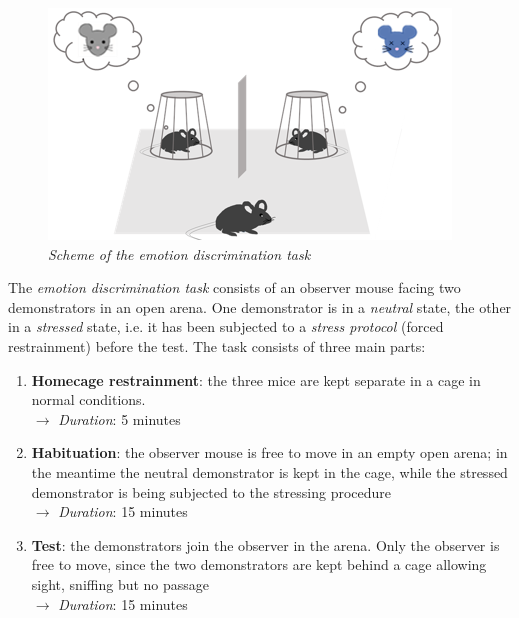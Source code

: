 \documentclass[a4paper]{article}
\begin{document}
\begin{figure}[H]
	\begin{center}
		\includegraphics[scale=.90]{emotion_discrimination.png} 
	\end{center} 
	\caption{\textit{Scheme of the emotion discrimination task}}
	
\end{figure}

The \textit{emotion discrimination task} consists of an observer mouse facing two demonstrators in an open arena. One demonstrator is in a \textit{neutral} state, the other in a \textit{stressed} state, i.e. it has been subjected to a \textit{stress protocol} (forced restrainment) before the test. The task consists of three main parts:

\begin{enumerate}
	
	\item \textbf{Homecage restrainment}: the three mice are kept separate in a cage in normal conditions. \\
	$\longrightarrow$ \textit{Duration}: 5 minutes
	
	\item \textbf{Habituation}: the observer mouse is free to move in an empty open arena; in the meantime the neutral demonstrator is kept in the cage, while the stressed demonstrator is being subjected to the stressing procedure \\
	$\longrightarrow$  \textit{Duration}: 15 minutes
	
	\item \textbf{Test}: the demonstrators join the observer in the arena. Only the observer is free to move, since the two demonstrators are kept behind a cage allowing sight, sniffing but no passage \\
	$\longrightarrow$  \textit{Duration}: 15 minutes
\end{enumerate}
\end{document}
